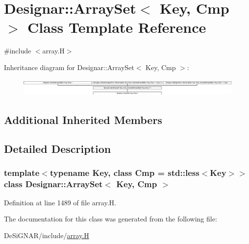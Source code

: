 \hypertarget{class_designar_1_1_array_set}{}\section{Designar\+:\+:Array\+Set$<$ Key, Cmp $>$ Class Template Reference}
\label{class_designar_1_1_array_set}


{\ttfamily \#include $<$array.\+H$>$}

Inheritance diagram for Designar\+:\+:Array\+Set$<$ Key, Cmp $>$\+:\begin{figure}[H]
\begin{center}
\leavevmode
\includegraphics[height=0.922570cm]{class_designar_1_1_array_set}
\end{center}
\end{figure}
\subsection*{Additional Inherited Members}


\subsection{Detailed Description}
\subsubsection*{template$<$typename Key, class Cmp = std\+::less$<$\+Key$>$$>$\newline
class Designar\+::\+Array\+Set$<$ Key, Cmp $>$}



Definition at line 1489 of file array.\+H.



The documentation for this class was generated from the following file\+:\begin{DoxyCompactItemize}
\item 
De\+Si\+G\+N\+A\+R/include/\hyperlink{array_8_h}{array.\+H}\end{DoxyCompactItemize}
